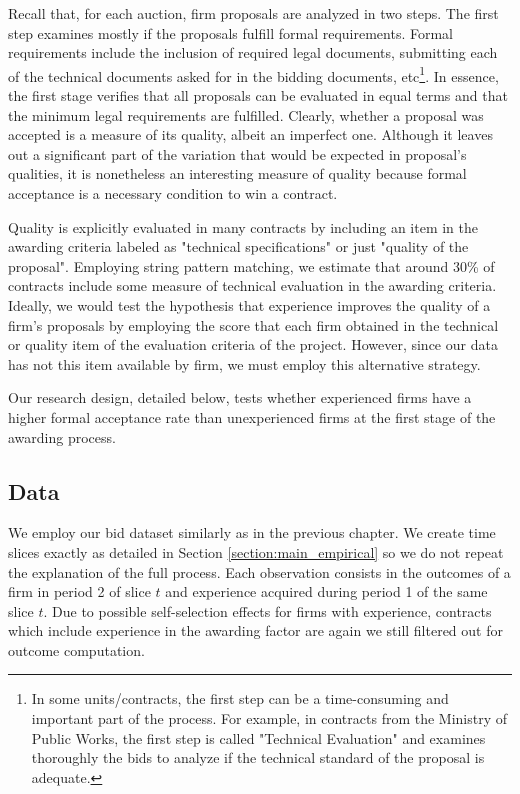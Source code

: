 Recall that, for each auction, firm proposals are analyzed in two steps. The first step examines mostly if the proposals fulfill formal requirements. Formal requirements include the inclusion of required legal documents, submitting each of the technical documents asked for in the bidding documents, etc\footnote{In some units/contracts, the first step can be a time-consuming and important part of the process. For example, in contracts from the Ministry of Public Works, the first step is called "Technical Evaluation" and examines thoroughly the bids to analyze if the technical standard of the proposal is adequate.}. In essence, the first stage verifies that all proposals can be evaluated in equal terms and that the minimum legal requirements are fulfilled. Clearly, whether a proposal was accepted is a measure of its quality, albeit an imperfect one. Although it leaves out a significant part of the variation that would be expected in proposal's qualities, it is nonetheless an interesting measure of quality because formal acceptance is a necessary condition to win a contract.

Quality is explicitly evaluated in many contracts by including an item in the awarding criteria labeled as "technical specifications" or just "quality of the proposal". Employing string pattern matching, we estimate that around 30\% of contracts include some measure of technical evaluation in the awarding criteria.  Ideally, we would test the hypothesis that experience improves the quality of a firm's proposals by employing the score that each firm obtained in the technical or quality item of the evaluation criteria of the project. However, since our data has not this item available by firm, we must employ this alternative strategy.

Our research design, detailed below, tests whether experienced firms have a higher formal acceptance rate than unexperienced firms at the first stage of the awarding process.

\subsection{Data}
We employ our bid dataset similarly as in the previous chapter. We create time slices exactly as detailed in Section \ref{section:main_empirical} so we do not repeat the explanation of the full process.  Each observation consists in the outcomes of a firm in period 2 of slice $t$ and experience acquired during period 1 of the same slice $t$. Due to possible self-selection effects for firms with experience, contracts which include experience in the awarding factor are again we still filtered out for outcome computation.

